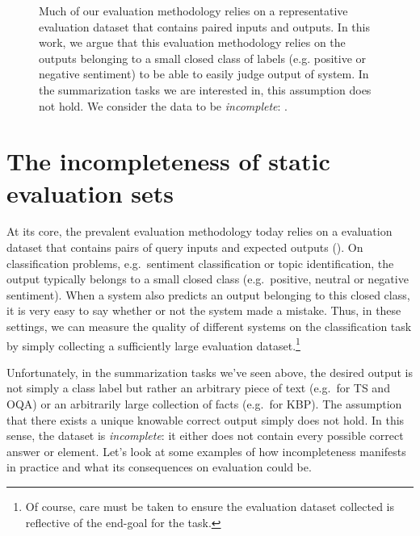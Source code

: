 \begin{figure}
  \caption[Complete and incomplete evaluation sets]{\label{fig:intro:evaluation-data} 
  Much of our evaluation methodology relies on a representative evaluation dataset that contains paired inputs and outputs.
  In this work, we argue that this evaluation methodology relies on the outputs belonging to a small closed class of labels (e.g. positive or negative sentiment) to be able to easily judge output of system.
  In the summarization tasks we are interested in, this assumption does not hold.
  We consider the data to be \textit{incomplete}: .
  }
\end{figure}
\section{The incompleteness of static evaluation sets}
At its core, the prevalent evaluation methodology today relies on a evaluation dataset that contains pairs of query inputs and expected outputs ().
On classification problems, e.g.\ sentiment classification or topic identification, the output typically belongs to a small closed class (e.g.\ positive, neutral or negative sentiment).
When a system also predicts an output belonging to this closed class, it is very easy to say whether or not the system made a mistake.
Thus, in these settings, we can measure the quality of different systems on the classification task by simply collecting a sufficiently large evaluation dataset.\footnote{%
Of course, care must be taken to ensure the evaluation dataset collected is reflective of the end-goal for the task.}

Unfortunately, in the summarization tasks we've seen above, the desired output is not simply a class label but rather an arbitrary piece of text (e.g.\ for TS and OQA) or an arbitrarily large collection of facts (e.g.\ for KBP).
The assumption that there exists a unique knowable correct output simply does not hold.
In this sense, the dataset is \textit{incomplete}: it either does not contain every possible correct answer or element.
Let's look at some examples of how incompleteness manifests in practice and what its consequences on evaluation could be.

